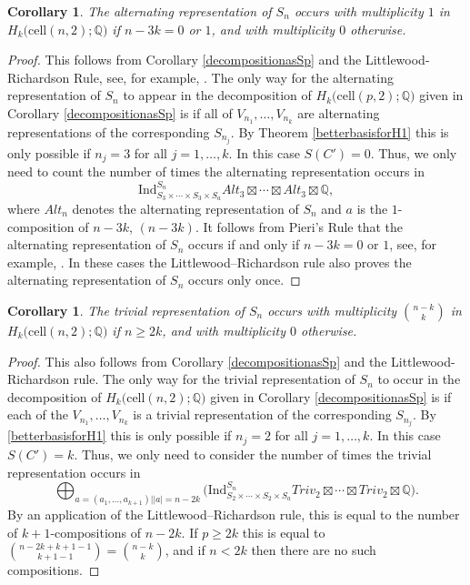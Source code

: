 \documentclass[12py]{amsart}%
\newtheorem{cor}[thm]{Corollary}
\theoremstyle{definition}\newtheorem{definition}[thm]{Definition}
\theoremstyle{definition}
\newcommand{\Q}{\ensuremath{\mathbb{Q}}}
\begin{document}
\begin{cor}
The alternating representation of $S_{n}$ occurs with multiplicity $1$ in $H_{k}\big(\text{cell}(n,2);\Q\big)$ if $n-3k=0$ or $1$, and with multiplicity $0$ otherwise.
\end{cor}

\begin{proof}
This follows from Corollary \ref{decompositionasSp} and the Littlewood-Richardson Rule, see, for example, \cite[A.8]{fulton2013representation}. The only way for the alternating representation of $S_{n}$ to appear in the decomposition of $H_{k}\big(\text{cell}(p,2);\Q\big)$ given in Corollary \ref{decompositionasSp} is if all of $V_{n_{1}}, \dots, V_{n_{k}}$ are alternating representations of the corresponding $S_{n_{j}}$. By Theorem \ref{betterbasisforH1} this is only possible if $n_{j}=3$ for all $j=1,\dots, k$. In this case $S(C')=0$. Thus, we only need to count the number of times the alternating representation occurs in
\[
\text{Ind}^{S_{n}}_{S_{3}\times\cdots\times S_{3}\times S_{a}}Alt_{3}\boxtimes\cdots\boxtimes Alt_{3}\boxtimes \Q,
\]
where $Alt_{n}$ denotes the alternating representation of $S_{n}$ and $a$ is the $1$-composition of $n-3k$, $(n-3k)$. It follows from Pieri's Rule that the alternating representation of $S_{n}$ occurs if and only if $n-3k=0$ or $1$, see, for example, \cite[A.7]{fulton2013representation}. In these cases the Littlewood--Richardson rule also proves the alternating representation of $S_{n}$ occurs only once.
\end{proof}

\begin{cor}\label{trivappear}
The trivial representation of $S_{n}$ occurs with multiplicity $\binom{n-k}{k}$ in $H_{k}\big(\text{cell}(n,2);\Q\big)$ if $n\ge 2k$, and with multiplicity $0$ otherwise.
\end{cor}

\begin{proof}
This also follows from Corollary \ref{decompositionasSp} and the Littlewood-Richardson rule. The only way for the trivial representation of $S_{n}$ to occur in the decomposition of $H_{k}\big(\text{cell}(n,2);\Q\big)$ given in Corollary \ref{decompositionasSp} is if each of the $V_{n_{1}},\dots, V_{n_{k}}$ is a trivial representation of the corresponding $S_{n_{j}}$. By \ref{betterbasisforH1} this is only possible if $n_{j}=2$ for all $j=1,\dots, k$. In this case $S(C')=k$. Thus, we only need to consider the number of times the trivial representation occurs in 
\[
\bigoplus_{a=(a_{1},\dots, a_{k+1})||a|=n-2k}\big(\text{Ind}^{S_{n}}_{S_{2}\times\cdots\times S_{2}\times S_{a}}Triv_{2}\boxtimes\cdots\boxtimes Triv_{2}\boxtimes \Q\big).
\]
By an application of the Littlewood--Richardson rule, this is equal to the number of $k+1$-compositions of $n-2k$. If $p\ge2k$ this is equal to $\binom{n-2k+k+1-1}{k+1-1}=\binom{n-k}{k}$, and if $n<2k$ then there are no such compositions. \end{proof}
\end{document}
